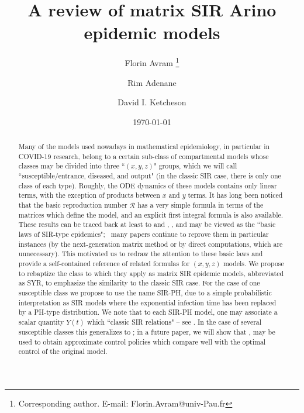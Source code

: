 \documentclass[notitlepage,11pt]{article}
\date{\today}
\title {%
A review of matrix SIR Arino  epidemic models %
}
\author[1]{Florin Avram \footnote{Corresponding author. E-mail:
     Florin.Avram@univ-Pau.fr}}
\author[2]{Rim Adenane}
\author[3]{David I. Ketcheson}
\affil[1]{Laboratoire de Math\'{e}matiques Appliqu\'{e}es, Universit\'{e} de Pau, France 64000 }
\affil[2]{Département des Mathématiques, Université Ibn-Tofail, Kenitra, Maroc 14000}
\affil[3]{King Abdullah University of Science and Technology, Thuwal 23955, Arabie saoudite}
\numberwithin{equation}{section}
\def\mR{\mathcal R} \def\mI{\mathcal I}\def\oth{otherwise}
\renewcommand{\(}{\left(}
\renewcommand{\)}{\right)}
\begin{document}
\maketitle







\begin{abstract}


Many of the models used nowadays in mathematical epidemiology, in particular in COVID-19 research, belong  to a certain sub-class of compartmental  models whose classes  may be divided into three ``$(x,y,z)$"  groups, which we will call  \resp ``susceptible/entrance, diseased, and output" (in the classic SIR case, there is only one class of each type). Roughly, the ODE dynamics of these models contains only linear terms, with the exception of products between $x$ and $y$ terms. It has long been noticed that   the basic reproduction number  $\mR$ has a very simple formula  in terms of the matrices which define the model, and an explicit  first integral  formula  is also  available. These results can be traced back at least to \cite{Arino} and \cite{Feng}, \resp, and may be viewed as the ``basic laws of SIR-type epidemics"; \how\ many  papers  continue to reprove them  in particular instances (by the next-generation matrix method or by direct computations, which are unnecessary). This motivated us to redraw the attention to these basic laws and provide a self-contained reference of  related formulas for $(x,y,z)$ models.  {We propose to rebaptize the class to which they apply as matrix SIR   epidemic models, abbreviated as SYR, to emphasize  the similarity to the classic SIR case.  For the case of one susceptible class we propose  to use the name SIR-PH, due to a simple probabilistic interpretation  as  SIR models where the exponential infection time has been replaced by a PH-type distribution.}
We note  that to each SIR-PH  model,  one may associate   a  scalar quantity $Y(t)$  which \sats ``classic  SIR   relations" -- see . In  the case of several  susceptible classes this generalizes to ; in a future paper, we will show that ,     may be used to obtain approximate control policies which
compare well with the optimal control of the original model. %

\end{abstract}
\tableofcontents


\end{document}
